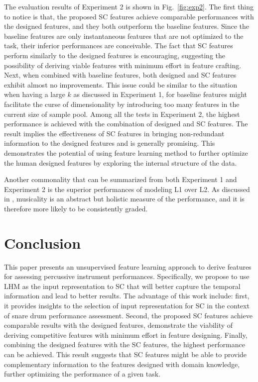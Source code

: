 \documentclass{article}
\begin{document}
The evaluation results of Experiment 2 is shown in Fig.~\ref{fig:exp2}. The first thing to notice is that, the proposed SC features achieve comparable performances with the designed features, and they both outperform the baseline features. Since the baseline features are only instantaneous features that are not optimized to the task, their inferior performances are conceivable. The fact that SC features perform similarly to the designed features is encouraging, suggesting the possibility of deriving viable features with minimum effort in feature crafting. Next, when combined with baseline features, both designed and SC features exhibit almost no improvements. This issue could be similar to the situation when having a large $k$ as discussed in Experiment 1, for baseline features might facilitate the curse of dimensionality by introducing too many features in the current size of sample pool. Among all the tests in Experiment 2, the highest performance is achieved with the combination of designed and SC features. The result implies the effectiveness of SC features in bringing non-redundant information to the designed features and is generally promising. This demonstrates the potential of using feature learning method to further optimize the human designed features by exploring the internal structure of the data.   

Another commonality that can be summarized from both Experiment 1 and Experiment 2 is the superior performances of modeling L1 over L2. As discussed in \cite{Wu2016}, musicality is an abstract but holistic measure of the performance, and it is therefore more likely to be consistently graded. 

\section{Conclusion}\label{sec:conclusion}
This paper presents an unsupervised feature learning approach to derive features for assessing percussive instrument performances. Specifically, we propose to use LHM as the input representation to SC that will better capture the temporal information and lead to better results. The advantage of this work include: first, it provides insights to the selection of input representation for SC in the context of snare drum performance assessment. Second, the proposed SC features achieve comparable results with the designed features, demonstrate the viability of deriving competitive features with minimum effort in feature designing. Finally, combining the designed features with the SC features, the highest performance can be achieved. This result suggests that SC features might be able to provide complementary information to the features designed with domain knowledge, further optimizing the performance of a given task. 
\end{document}
